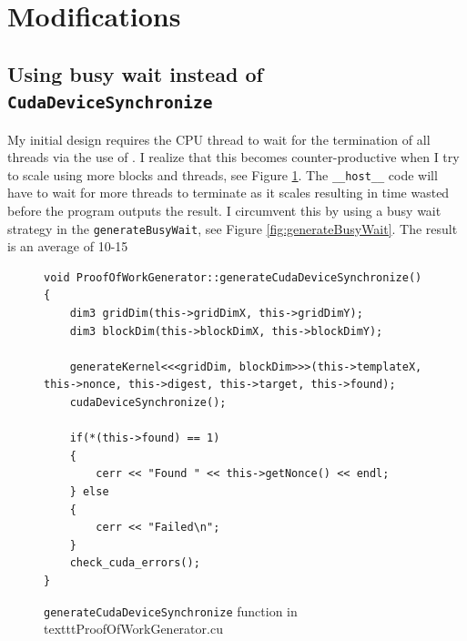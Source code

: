 \documentclass[a4paper]{article}
\begin{document}
\section{Modifications}
\subsection{Using busy wait instead of \texttt{CudaDeviceSynchronize}}
My initial design requires the CPU thread to wait for the termination of all threads via the use of . I realize that this becomes counter-productive when I try to scale using more blocks and threads, see Figure \ref{fig:generateCudaDeviceSynchronize}. The \texttt{__host__} code will have to wait for more threads to terminate as it scales resulting in time wasted before the program outputs the result. I circumvent this by using a busy wait strategy in the \texttt{generateBusyWait}, see Figure \ref{fig:generateBusyWait}. The result is an average of 10-15%

\begin{figure}
\begin{lstlisting}
void ProofOfWorkGenerator::generateCudaDeviceSynchronize()
{
    dim3 gridDim(this->gridDimX, this->gridDimY);
    dim3 blockDim(this->blockDimX, this->blockDimY);

    generateKernel<<<gridDim, blockDim>>>(this->templateX, this->nonce, this->digest, this->target, this->found);
    cudaDeviceSynchronize();

    if(*(this->found) == 1)
    {
        cerr << "Found " << this->getNonce() << endl;
    } else 
    {
        cerr << "Failed\n";
    }
    check_cuda_errors();
}
\end{lstlisting}
\caption{\label{fig:generateCudaDeviceSynchronize} \texttt{generateCudaDeviceSynchronize} function in texttt{ProofOfWorkGenerator.cu}}
\end{figure}
\end{document}
